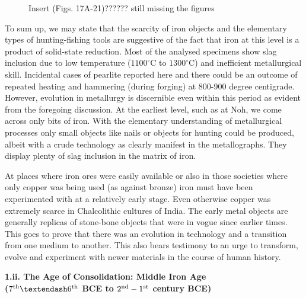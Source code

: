 \begin{figure}[H]
Insert (Figs. 17A-21)?????? still missing the figures
\end{figure}
To sum up, we may state that the scarcity of iron objects and the elementary types of hunting-fishing tools are suggestive of the fact that iron at this level is a product of solid-state reduction. Most of the analysed specimens show slag inclusion due to low temperature ($1100^{\circ}$C to $1300^{\circ}$C) and inefficient metallurgical skill. Incidental cases of pearlite reported here and there could be an outcome of repeated heating and hammering (during forging) at 800-900 degree centigrade. However, evolution in metallurgy is discernible even within this period as evident from the foregoing discussion. At the earliest level, such as at Noh, we come across only bits of iron. With the elementary understanding of metallurgical processes only small objects like nails or objects for hunting could be produced, albeit with a crude technology as clearly manifest in the metallographs. They display plenty of slag inclusion in the matrix of iron.

At places where iron ores were easily available or also in those societies where only copper was being used (as against bronze) iron must have been experimented with at a relatively early stage. Even otherwise copper was extremely scarce in Chalcolithic cultures of India. The early metal objects are generally replicas of stone-bone objects that were in vogue since earlier times. This goes to prove that there was an evolution in technology and a transition from one medium to another. This also bears testimony to an urge to transform, evolve and experiment with newer materials in the course of human history.


\textbf{\large 1.ii. The Age of Consolidation: Middle Iron Age\\ ($7^{\rm th} – 6^{\rm th}$ BCE to $2^{\rm nd} -1^{\rm st}$ century BCE)}

